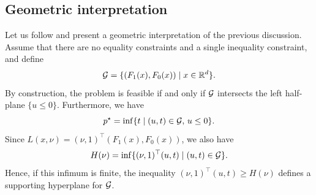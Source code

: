  
 
     \subsection{Geometric interpretation}
     \label{sec:geometric-interpretation}
 
     Let us follow \cite[Section~5.3]{boydConvex2023} and present a geometric interpretation of the previous discussion.
     Assume that there are no equality constraints and a single inequality constraint, and define
     \begin{equation}
         \mathcal{G} = \{ (F_1(x), F_0(x)) \mid x\in \mathbb{R}^d\}.
     \end{equation}
     By construction, the problem is feasible if and only if $\mathcal{G}$ intersects the left half-plane $\{u\le 0\}$.
     Furthermore, we have
     \begin{equation}
         p^\star  = \inf\{ t \mid (u,t)\in \mathcal{G},\, u\le 0\}.
     \end{equation}
     Since $L(x,\nu) = (\nu,1)^\top (F_1(x),F_0(x))$, we also have
     \begin{equation}
         H(\nu) = \inf \{  (\nu,1)^\top (u,t) \mid (u,t)\in \mathcal{G} \}.
     \end{equation}
     Hence, if this infimum is finite, the inequality $(\nu,1)^\top (u,t)\ge H(\nu)$ defines a supporting hyperplane for $\mathcal{G}$.
 
